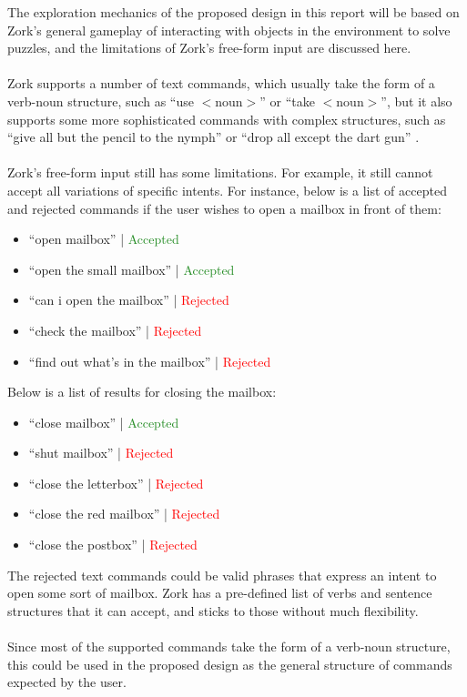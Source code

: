 \documentclass[11pt]{article}
\begin{document}
The exploration mechanics of the proposed design in this report will be based on Zork's general gameplay of interacting with objects in the environment to solve puzzles, and the limitations of Zork's free-form input are discussed here.
\\
\\
Zork supports a number of text commands, which usually take the form of a verb-noun structure, such as ``use $<$noun$>$'' or ``take $<$noun$>$'', but it also supports some more sophisticated commands with complex structures, such as ``give all but the pencil to the nymph'' or ``drop all except the dart gun'' \cite{RefWorks:36}.
\\
\\
Zork's free-form input still has some limitations. For example, it still cannot accept all variations of specific intents. For instance, below is a list of accepted and rejected commands if the user wishes to open a mailbox in front of them:
\begin{itemize}
	\item ``open mailbox'' | \textcolor{ForestGreen}{Accepted}
	\item ``open the small mailbox'' | \textcolor{ForestGreen}{Accepted}
	\item ``can i open the mailbox'' | \textcolor{red}{Rejected}
	\item ``check the mailbox'' | \textcolor{red}{Rejected}
	\item ``find out what's in the mailbox'' | \textcolor{red}{Rejected}
\end{itemize}
Below is a list of results for closing the mailbox:
\begin{itemize}
	\item ``close mailbox'' | \textcolor{ForestGreen}{Accepted}
	\item ``shut mailbox'' | \textcolor{red}{Rejected}
	\item ``close the letterbox'' | \textcolor{red}{Rejected}
	\item ``close the red mailbox'' |\textcolor{red}{ Rejected}
	\item ``close the postbox'' |\textcolor{red}{ Rejected}
\end{itemize}
The rejected text commands could be valid phrases that express an intent to open some sort of mailbox. Zork has a pre-defined list of verbs and sentence structures that it can accept, and sticks to those without much flexibility.
\\
\\
Since most of the supported commands take the form of a verb-noun structure, this could be used in the proposed design as the general structure of commands expected by the user.
\end{document}
